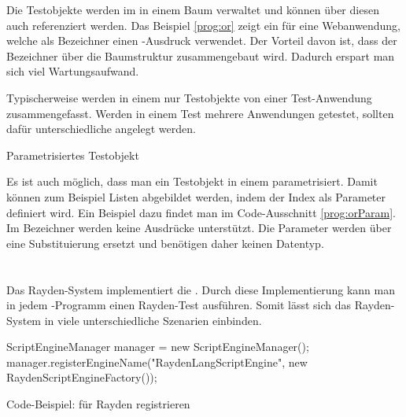 \SuperPar
Die Testobjekte werden im  in einem Baum verwaltet und können über diesen auch referenziert werden. Das Beispiel \ref{prog:or} zeigt ein  für eine Webanwendung, welche als Bezeichner einen -Ausdruck verwendet.  Der Vorteil davon ist, dass der Bezeichner  über die Baumstruktur zusammengebaut wird. Dadurch erspart man sich viel Wartungsaufwand. 

\SuperPar
Typischerweise werden in einem  nur Testobjekte von einer Test-Anwendung zusammengefasst. Werden in einem Test mehrere Anwendungen getestet, sollten dafür unterschiedliche  angelegt werden.

\begin{program}
\caption{Parametrisiertes Testobjekt}
\label{prog:orParam}
\end{program}

\SuperPar
Es ist auch möglich, dass man ein Testobjekt in einem  parametrisiert. Damit können zum Beispiel Listen abgebildet werden, indem der Index als Parameter definiert wird. Ein Beispiel dazu findet man im Code-Ausschnitt \ref{prog:orParam}. Im Bezeichner  werden keine Ausdrücke unterstützt. Die Parameter werden über eine Substituierung ersetzt und benötigen daher keinen Datentyp.


\section{}

Das Rayden-System implementiert die . Durch diese Implementierung kann man in jedem -Programm einen Rayden-Test ausführen. Somit lässt sich das Rayden-System in viele unterschiedliche Szenarien einbinden. 

\begin{program}
\begin{JavaCode}
ScriptEngineManager manager = new ScriptEngineManager();
manager.registerEngineName("RaydenLangScriptEngine", new RaydenScriptEngineFactory());
\end{JavaCode}
\caption{Code-Beispiel:  für Rayden registrieren}
\label{prog:registerFactory}
\end{program}

